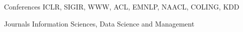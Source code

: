 

\begin{cvskills}

  \cvskill
    {Conferences} %
    {ICLR, SIGIR, WWW, ACL, EMNLP, NAACL, COLING, KDD} %

  \cvskill
    {Journals} %
    {Information Sciences, Data Science and Management} %

\end{cvskills}
